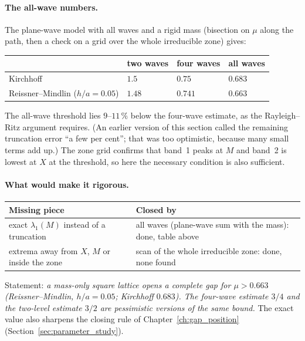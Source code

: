 \paragraph{The all-wave numbers.} The plane-wave model with all waves and a rigid
mass (bisection on $\mu$ along the path, then a check on a grid over the whole
irreducible zone) gives:
\begin{center}
\begin{tabular}{|l|l|l|l|}
\hline
 & two waves & four waves & all waves \\
\hline
Kirchhoff & $1.5$ & $0.75$ & $0.683$ \\
Reissner--Mindlin ($h/a = 0.05$) & $1.48$ & $0.741$ & $0.663$ \\
\hline
\end{tabular}
\end{center}
The all-wave threshold lies $9$--$11\,\%$ below the four-wave estimate, as the
Rayleigh--Ritz argument requires. (An earlier version of this section called the
remaining truncation error ``a few per cent''; that was too optimistic, because many
small terms add up.) The zone grid confirms that band~1 peaks at $M$ and band~2 is
lowest at $X$ at the threshold, so here the necessary condition is also sufficient.

\paragraph{What would make it rigorous.}
\begin{center}
\begin{tabular}{|p{}|p{}|}
\hline
Missing piece & Closed by \\
\hline
exact $\lambda_1(M)$ instead of a truncation & all waves (plane-wave sum with the mass): done, table above \\
extrema away from $X$, $M$ or inside the zone & scan of the whole irreducible zone: done, none found \\
\hline
\end{tabular}
\end{center}
Statement: \emph{a mass-only square lattice opens a complete gap for
$\mu > 0.663$ (Reissner--Mindlin, $h/a = 0.05$; Kirchhoff $0.683$). The four-wave
estimate $3/4$ and the two-level estimate $3/2$ are pessimistic versions of the same
bound.} The exact value also sharpens the closing rule of Chapter~\ref{ch:gap_position}
(Section~\ref{sec:parameter_study}).

